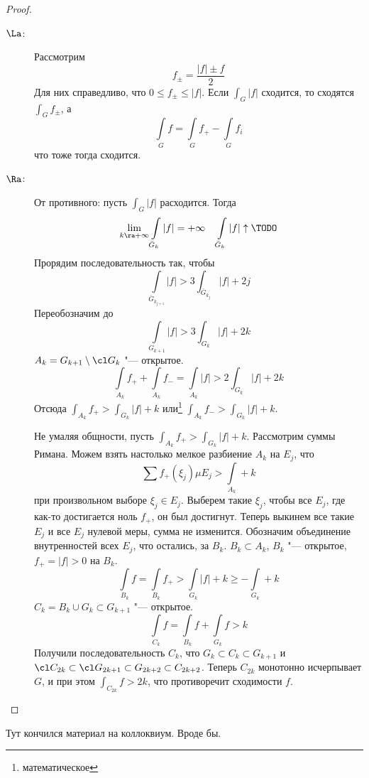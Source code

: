 \begin{proof}
	\begin{description}
	\item[$\La$:]
		Рассмотрим
		\[ f_\pm = \frac{|f| \pm f}2 \]
		Для них справедливо, что $0 \le f_\pm \le |f|$.
		Если $\int_G |f|$ сходится, то сходятся $\int_G f_\pm$, а
		\[ \int\limits_G f = \int\limits_G f_+ - \int\limits_G f_i\]
		что тоже тогда сходится.

	\item[$\Ra$:]
		От противного: пусть $\int_G |f|$ расходится.
		Тогда
		\[ \lim_{k \ra +\infty} \int\limits_{\bar G_k} |f| = +\infty \quad \int\limits_{\bar G_k} |f| \uparrow \TODO \]
		Прорядим последовательность так, чтобы
		\[ \int\limits_{\bar G_{k_{j+1}}} |f| > 3 \int_{\bar G_{k_j}} |f| + 2j \]
		Переобозначим до
		\[ \int\limits_{G_{k+1}} |f| > 3 \int_{G_{k}} |f| + 2k \]
		$A_k = G_{k+1} \setminus \cl G_k$ "--- открытое.
		\[ \int\limits_{A_k} f_+ + \int\limits_{A_k} f_- = \int\limits_{A_k} |f| > 2 \int_{G_{k}} |f| + 2k \]
		Отсюда $\int_{A_k} f_+ > \int_{G_{k}} |f| + k$ или\footnote{математическое} $\int_{A_k} f_- > \int_{G_{k}} |f| + k$.

		Не умаляя общности, пусть $\int_{A_k} f_+ > \int_{G_{k}} |f| + k$.
		Рассмотрим суммы Римана.
		Можем взять настолько мелкое разбиение $A_k$ на $E_j$, что
		\[ \sum f_+(\xi_j) \mu E_j > \int\limits_{A_k} + k \]
		при произвольном выборе $\xi_j \in E_j$.
		Выберем такие $\xi_j$, чтобы все $E_j$, где как-то достигается ноль $f_+$, он был достигнут.
		Теперь выкинем все такие $E_j$ и все $E_j$ нулевой меры, сумма не изменится.
		Обозначим объединение внутренностей всех $E_j$, что остались, за $B_k$.
		$B_k \subset A_k$, $B_k$ "--- открытое, $f_+ = |f| > 0$ на $B_k$.
		\[ \int\limits_{B_k} f = \int\limits_{B_k} f_+ > \int\limits_{G_k} |f| + k \ge -\int\limits_{G_k} + k \]
		$C_k = B_k \cup G_k \subset G_{k+1}$ "--- открытое.
		\[ \int\limits_{C_k} f = \int\limits_{B_k} f + \int\limits_{G_k} f > k \]
		Получили последовательность $C_k$, что $G_k \subset C_k \subset G_{k+1}$ и $\cl C_{2k} \subset \cl G_{2k+1} \subset G_{2k+2} \subset C_{2k+2}$.
		Теперь $C_{2k}$ монотонно исчерпывает $G$, и при этом $\int_{C_{2k}} f > 2k$, что противоречит сходимости $f$.
	\end{description}
\end{proof}

\begin{center}
\LARGE
Тут кончился материал на коллоквиум. Вроде бы.
\end{center}

